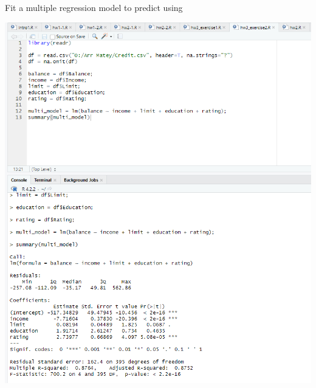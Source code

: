 
Fit a multiple regression model to predict  using 

\soln* \begin{center}
    \includegraphics[width=6in]{img/ex2.PNG}
\end{center}